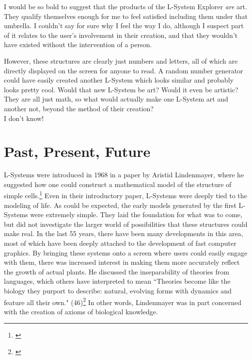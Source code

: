 \documentclass[12pt,twoside]{reedthesis}
\begin{document}
	I would be so bold to suggest that the products of the L-System Explorer \textit{are} art. They qualify themselves enough for me to feel satisfied including them under that umbrella. I couldn't say for sure why I feel the way I do, although I suspect part of it relates to the user's involvement in their creation, and that they wouldn't have existed without the intervention of a person.
	
	However, these structures are clearly just numbers and letters, all of which are directly displayed on the screen for anyone to read. A random number generator could have easily created another L-System which looks similar and probably looks pretty cool. Would that new L-System be art? Would it even be artistic? They are all just math, so what would actually make one L-System art and another not, beyond the method of their creation?\\
	
	I don't know!


\chapter{Past, Present, Future}

	L-Systems were introduced in 1968 in a paper by Aristid Lindenmayer, where he suggested how one could construct a mathematical model of the structure of simple cells.\footnote{\cite{OG1967}} Even in their introductory paper, L-Systems were deeply tied to the modeling of life. As could be expected, the early models generated by the first L-Systems were extremely simple. They laid the foundation for what was to come, but did not investigate the larger world of possibilities that these structures could make real. In the last 55 years, there have been many developments in this area, most of which have been deeply attached to the development of fast computer graphics. By bringing these systems onto a screen where users could easily engage with them, there was increased interest in making them more accurately reflect the growth of actual plants. He discussed the inseparability of theories from languages, which others have interpreted to mean ``Theories become like the biology they purport to describe: natural, evolving forms with dynamics and feature all their own." (46)\footnote{\cite{theory2004}} In other words, Lindenmayer was in part concerned with the creation of axioms of biological knowledge.
	
	
\end{document}
